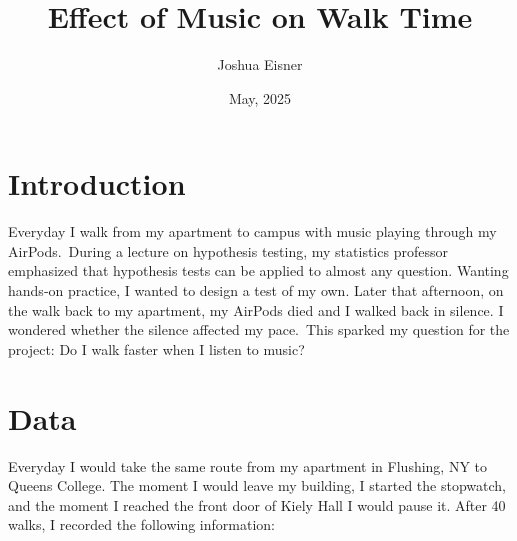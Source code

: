 \documentclass[11pt]{article}
\title{Effect of Music on Walk Time}
\author{Joshua Eisner}
\date{May, 2025}
\begin{document}
\maketitle

\section{Introduction}
Everyday I walk from my apartment to campus with music playing through my AirPods. During a lecture on hypothesis testing, my statistics professor emphasized that hypothesis tests can be applied to almost any question. Wanting hands‑on practice, I wanted to design a test of my own. Later that afternoon, on the walk back to my apartment, my AirPods died and I walked back in silence. I wondered whether the silence affected my pace. This sparked my question for the project: Do I walk faster when I listen to music?

\section{Data}
Everyday I would take the same route from my apartment in Flushing, NY to Queens College. 
The moment I would leave my building, I started the stopwatch, and the moment I reached 
the front door of Kiely Hall I would pause it.  After 40 walks, I recorded the following 
information:
\end{document}
